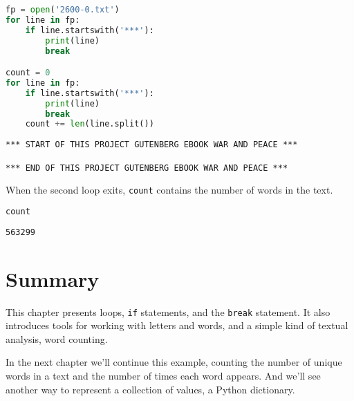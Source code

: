 \begin{lstlisting}[language=Python,style=source]
fp = open('2600-0.txt')
for line in fp:
    if line.startswith('***'):
        print(line)
        break

count = 0
for line in fp:
    if line.startswith('***'):
        print(line)
        break
    count += len(line.split())
\end{lstlisting}

\begin{lstlisting}[style=output]
*** START OF THIS PROJECT GUTENBERG EBOOK WAR AND PEACE ***

*** END OF THIS PROJECT GUTENBERG EBOOK WAR AND PEACE ***

\end{lstlisting}

When the second loop exits, \passthrough{\lstinline!count!} contains the
number of words in the text.

\begin{lstlisting}[language=Python,style=source]
count
\end{lstlisting}

\begin{lstlisting}[style=output]
563299
\end{lstlisting}

\section{Summary}\label{summary}

This chapter presents loops, \passthrough{\lstinline!if!} statements,
and the \passthrough{\lstinline!break!} statement. It also introduces
tools for working with letters and words, and a simple kind of textual
analysis, word counting.

In the next chapter we'll continue this example, counting the number of
unique words in a text and the number of times each word appears. And
we'll see another way to represent a collection of values, a Python
dictionary.
